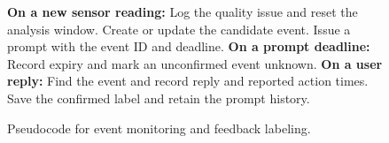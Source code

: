 \begin{figure}[t]
\begin{minipage}{\columnwidth}
\small
\begin{algorithmic}[1]
\STATE \textbf{On a new sensor reading:}
    \STATE Log the quality issue and reset the analysis window.
    \STATE Create or update the candidate event.
        \STATE Issue a prompt with the event ID and deadline.
    \ENDIF
\ENDIF
\STATE \textbf{On a prompt deadline:}
    \STATE Record expiry and mark an unconfirmed event unknown.
\ENDIF
\STATE \textbf{On a user reply:}
\STATE Find the event and record reply and reported action times.
    \STATE Save the confirmed label and retain the prompt history.
\ENDIF
\end{algorithmic}
\end{minipage}
\caption{Pseudocode for event monitoring and feedback labeling.}
\label{fig:event-pseudocode}
\end{figure}
